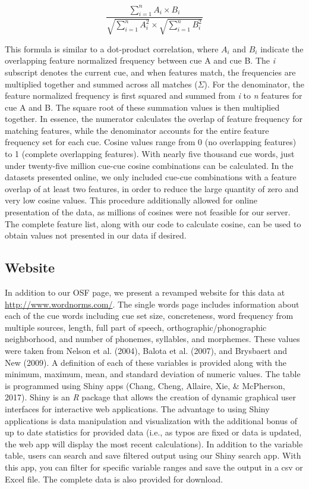 \documentclass[english,man]{apa6}
\theoremstyle{definition}
\theoremstyle{definition}
\theoremstyle{definition}
\theoremstyle{remark}
\begin{document}
\[
\frac{\sum_{i=1}^{n} A_i \times B_i} {\sqrt{\sum_{i=1}^{n} A_i^2} \times \sqrt{\sum_{i=1}^{n} B_i^2}}
\]

This formula is similar to a dot-product correlation, where \(A_i\) and
\(B_i\) indicate the overlapping feature normalized frequency between
cue A and cue B. The \emph{i} subscript denotes the current cue, and
when features match, the frequencies are multiplied together and summed
across all matches (\(\Sigma\)). For the denominator, the feature
normalized frequency is first squared and summed from \emph{i} to
\emph{n} features for cue A and B. The square root of these summation
values is then multiplied together. In essence, the numerator calculates
the overlap of feature frequency for matching features, while the
denominator accounts for the entire feature frequency set for each cue.
Cosine values range from 0 (no overlapping features) to 1 (complete
overlapping features). With nearly five thousand cue words, just under
twenty-five million cue-cue cosine combinations can be calculated. In
the datasets presented online, we only included cue-cue combinations
with a feature overlap of at least two features, in order to reduce the
large quantity of zero and very low cosine values. This procedure
additionally allowed for online presentation of the data, as millions of
cosines were not feasible for our server. The complete feature list,
along with our code to calculate cosine, can be used to obtain values
not presented in our data if desired.

\subsection{Website}\label{website}

In addition to our OSF page, we present a revamped website for this data
at \url{http://www.wordnorms.com/}. The single words page includes
information about each of the cue words including cue set size,
concreteness, word frequency from multiple sources, length, full part of
speech, orthographic/phonographic neighborhood, and number of phonemes,
syllables, and morphemes. These values were taken from Nelson et al.
(2004), Balota et al. (2007), and Brysbaert and New (2009). A definition
of each of these variables is provided along with the minimum, maximum,
mean, and standard deviation of numeric values. The table is programmed
using Shiny apps (Chang, Cheng, Allaire, Xie, \& McPherson, 2017). Shiny
is an \emph{R} package that allows the creation of dynamic graphical
user interfaces for interactive web applications. The advantage to using
Shiny applications is data manipulation and visualization with the
additional bonus of up to date statistics for provided data (i.e., as
typos are fixed or data is updated, the web app will display the most
recent calculations). In addition to the variable table, users can
search and save filtered output using our Shiny search app. With this
app, you can filter for specific variable ranges and save the output in
a csv or Excel file. The complete data is also provided for download.
\end{document}
